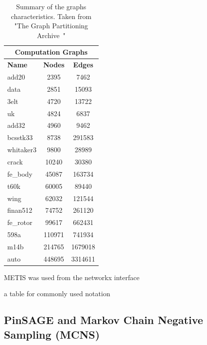 \begin{table}
\centering
\begin{tabular}{ |p{1.75cm}||cc|  }
\hline
\multicolumn{3}{|c|}{\textbf{Computation Graphs}} \\
\hline
\hline
\textbf{Name} & \textbf{Nodes} & \textbf{Edges} \\
\hline
add20 & 2395 & 7462  \\
data & 2851 & 15093  \\
3elt & 4720 & 13722  \\
uk & 4824 & 6837  \\
add32 & 4960 & 9462  \\
bcsstk33 & 8738 & 291583  \\
whitaker3 & 9800 & 28989  \\
crack & 10240 & 30380  \\
\hline
fe\_body & 45087 & 163734  \\
t60k & 60005 & 89440  \\
wing & 62032 & 121544  \\
finan512 & 74752 & 261120 \\
\hline
fe\_rotor & 99617 & 662431  \\
598a & 110971 & 741934  \\
m14b & 214765 & 1679018	 \\
auto & 448695 & 3314611  \\
\hline
\end{tabular}
\caption{\label{tab:comp_graphs}Summary of the graphs characteristics. Taken from "The Graph Partitioning Archive~\citep{archive}"}
\end{table}

METIS was used from the networkx interface

a table for commonly used notation

\subsection{PinSAGE and Markov Chain Negative Sampling (MCNS)}